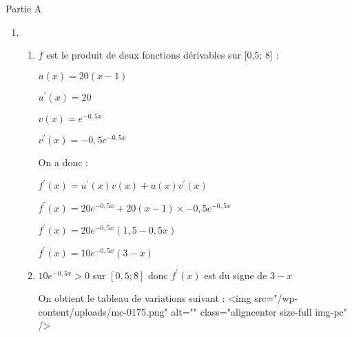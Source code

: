 \begin{corrige}
     \begin{h3}Partie A\end{h3}
     \begin{enumerate}
          \item
          \begin{enumerate}
               \item
               $f$ est le produit de deux fonctions dérivables sur [0,5; 8] :
               \par
               $u\left(x\right)=20\left(x-1\right)$
               \par
               $u^{\prime}\left(x\right)=20$
               \par
               $v\left(x\right)=e^{-0,5x}$
               \par
               $v^{\prime}\left(x\right)=-0,5e^{-0,5x}$
               \par
               On a donc :
               \par
               $f^{\prime}\left(x\right)=u^{\prime}\left(x\right)v\left(x\right)+u\left(x\right)v^{\prime}\left(x\right)$
               \par
               $f^{\prime}\left(x\right) = 20e^{-0,5x}+20\left(x-1\right)\times -0,5e^{-0,5x}$
               \par
               $f^{\prime}\left(x\right) = 20e^{-0,5x}\left(1,5-0,5x\right)$
               \par
               $f^{\prime}\left(x\right) = 10e^{-0,5x}\left(3-x\right)$
               \item
               $10e^{-0,5x} > 0$ sur $\left[0,5; 8\right]$ donc $f^{\prime}\left(x\right)$ est du signe de $3-x$
               \par
               On obtient le tableau de variations suivant :
               <img src="/wp-content/uploads/mc-0175.png" alt="" class="aligncenter size-full  img-pc" />
\begin{center}
 \begin{extern}%
\end{extern}
\end{center}
\end{enumerate}
\end{enumerate}
\end{corrige}
